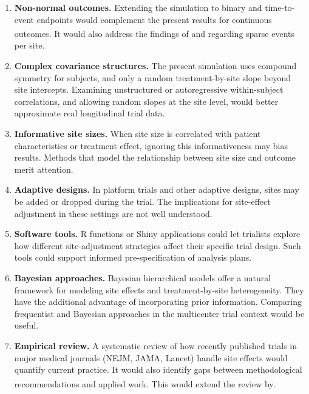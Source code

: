 \documentclass[
  11pt,
]{article}
\begin{document}
\begin{enumerate}
\def\labelenumi{\arabic{enumi}.}
\item
  \textbf{Non-normal outcomes.} Extending the simulation to binary
  and time-to-event endpoints would complement the present
  results for continuous outcomes. It would also address the
  findings of\textsuperscript{} and\textsuperscript{} regarding sparse
  events per site.
\item
  \textbf{Complex covariance structures.} The present simulation
  uses compound symmetry for subjects, and only a random
  treatment-by-site slope beyond site intercepts. Examining unstructured or
  autoregressive within-subject correlations, and allowing
  random slopes at the site level, would better approximate
  real longitudinal trial data.
\item
  \textbf{Informative site sizes.} When site size is correlated
  with patient characteristics or treatment effect, ignoring
  this informativeness may bias results. Methods that model
  the relationship between site size and outcome merit
  attention.
\item
  \textbf{Adaptive designs.} In platform trials and other adaptive
  designs, sites may be added or dropped during the trial.
  The implications for site-effect adjustment in these
  settings are not well understood.
\item
  \textbf{Software tools.} R functions or Shiny applications could
  let trialists explore how different site-adjustment
  strategies affect their specific trial design. Such tools
  could support informed pre-specification of analysis plans.
\item
  \textbf{Bayesian approaches.} Bayesian hierarchical models offer
  a natural framework for modeling site effects and
  treatment-by-site heterogeneity. They have the additional
  advantage of incorporating prior information. Comparing
  frequentist and Bayesian approaches in the multicenter
  trial context would be useful.
\item
  \textbf{Empirical review.} A systematic review of how recently
  published trials in major medical journals (NEJM, JAMA,
  Lancet) handle site effects would quantify current
  practice. It would also identify gaps between
  methodological recommendations and applied work. This would
  extend the review by\textsuperscript{}.
\end{enumerate}
\end{document}
